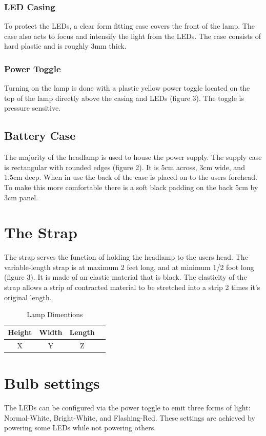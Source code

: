 \documentclass[12pt]{article}
\begin{document}
\subsubsection{LED Casing}
To protect the LEDs, a clear form fitting case covers the front of the lamp.  The case also acts to
focus and intensify the light from the LEDs. The case consists of hard plastic and is roughly
3mm thick.

\subsubsection{Power Toggle}
Turning on the lamp is done with a plastic yellow power toggle located on the top of the lamp
directly above the casing and LEDs (figure 3). The toggle is pressure sensitive.

\subsection{Battery Case}
The majority of the headlamp is used to house the power supply. The supply case is rectangular with
rounded edges (figure 2). It is 5cm across, 3cm wide, and 1.5cm deep. When in use the back of the case is
placed on to the users forehead. To make this more comfortable there is a soft black padding on the
back 5cm by 3cm panel.

\section{The Strap}
The strap serves the function of holding the headlamp to the users head. The variable-length strap
is at maximum 2 feet long, and at minimum 1/2 foot long (figure 3). It is made of an elastic material that
is black. The elasticity of the strap allows a strip of contracted material to be stretched into a
strip 2 times it's original length.
\begin{table}
\begin{tabular}{ | c | c | c | p{5cm} |}
    \hline
    Height & Width & Length \\ \hline
    X & Y & Z  \\ \hline
\end{tabular}
\caption{Lamp Dimentions}
\end{table}

\section{Bulb settings}
The LEDs can be configured via the power toggle to emit three forms of light: Normal-White,
Bright-White, and Flashing-Red. These settings are achieved by powering some LEDs while not
powering others.
\end{document}
